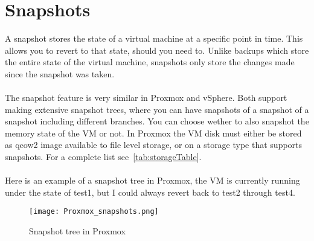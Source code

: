 \section{Snapshots}

A snapshot stores the state of a virtual machine at a specific point in time. This allows you to revert to that state, should you need to. Unlike backups which store the entire state of the virtual machine, snapshots only store the changes made since the snapshot was taken.
\\\\
The snapshot feature is very similar in Proxmox and vSphere. Both support making extensive snapshot trees, where you can have snapshots of a snapshot of a snapshot including different branches. You can choose wether to also snapshot the memory state of the VM or not. In Proxmox the VM disk must either be stored as qcow2 image available to file level storage, or on a storage type that supports snapshots. For a complete list see~\ref{tab:storageTable}.
\\\\
Here is an example of a snapshot tree in Proxmox, the VM is currently running under the state of test1, but I could always revert back to test2 through test4.

\begin{figure}[H]
	\centering
	\texttt{[image: Proxmox\_snapshots.png]} %
	\caption{Snapshot tree in Proxmox} %
	\label{fig:Snapshot tree in Proxmox} %
\end{figure}